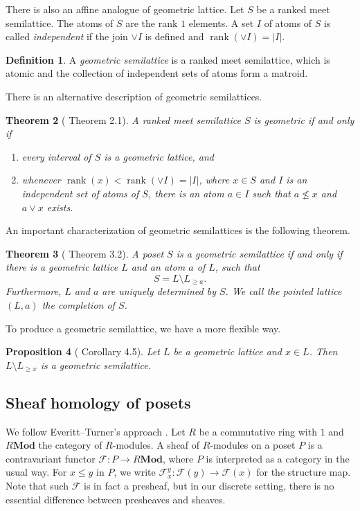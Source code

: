 \documentclass{amsart}
\numberwithin{equation}{section}
\newtheorem{thm}{Theorem}[section]
\newtheorem{prop}[thm]{Proposition}
\theoremstyle{plain}
\theoremstyle{remark}
\theoremstyle{definition}
\newtheorem{defn}[thm]{Definition}
\numberwithin{equation}{section}
\newcommand{\FF}{\mathscr{F}}
\DeclareMathOperator{\rank}{rank}
\newcommand{\Mod}{\mathbf{Mod}}
\begin{document}
There is also an affine analogue of geometric lattice. Let $S$ be a ranked meet semilattice. The atoms of $S$ are the rank $1$ elements. A set $I$ of atoms of $S$ is called {\it independent} if the join $\vee I$ is defined and $\rank(\vee I)=|I|$.

\begin{defn}
    A {\it geometric semilattice} is a ranked meet semilattice, which is atomic and the collection of independent sets of atoms form a matroid.
\end{defn}

There is an alternative description of geometric semilattices.
\begin{thm}[\cite{Wachs1986} Theorem 2.1]
    A ranked meet semilattice $S$ is geometric if and only if
    \begin{enumerate}
        \item every interval of $S$ is a geometric lattice, and
        \item whenever $\rank(x)<\rank(\vee I)=|I|$, where $x\in S$ and $I$ is an independent set of atoms of $S$, there is an atom $a\in I$ such that $a\not\leq x$ and $a\vee x$ exists.
    \end{enumerate}
\end{thm}

An important characterization of geometric semilattices is the following theorem.
\begin{thm}[\cite{Wachs1986} Theorem 3.2]\label{completion}
    A poset $S$ is a geometric semilattice if and only if there is a geometric lattice $L$ and an atom $a$ of $L$, such that
    \[
    S=L\setminus L_{\geq a}.
    \]
    Furthermore, $L$ and $a$ are uniquely determined by $S$. We call the pointed lattice $(L,a)$ the completion of $S$. 
\end{thm}
To produce a geometric semilattice, we have a more flexible way.
\begin{prop}[\cite{Wachs1986} Corollary 4.5]\label{filtercomplement}
    Let $L$ be a geometric lattice and $x\in L$. Then $L\setminus L_{\geq x}$ is a geometric semilattice.
\end{prop}


\subsection{Sheaf homology of posets}
We follow Everitt--Turner's approach \cite{Everitt2022}.
Let $R$ be a commutative ring with $1$ and $R\Mod$ the category of $R$-modules. A sheaf of $R$-modules on a poset $P$ is a contravariant functor $\FF:P\to R\Mod$, where $P$ is interpreted as a category in the usual way. For $x\leq y$ in $P$, we write $\FF^y_x: \FF(y)\to \FF(x)$ for the structure map.
Note that such $\FF$ is in fact a presheaf, but in our discrete setting, there is no essential difference between presheaves and sheaves.
\end{document}
